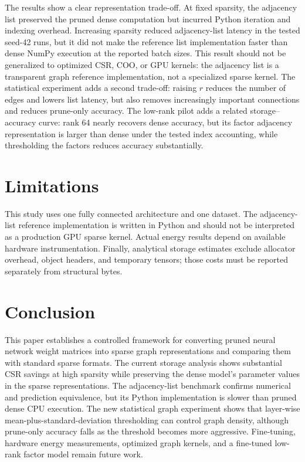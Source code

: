 \documentclass[11pt]{article}
\begin{document}
The results show a clear representation trade-off.  At fixed sparsity, the
adjacency list preserved the pruned dense computation but incurred Python
iteration and indexing overhead.  Increasing sparsity reduced adjacency-list
latency in the tested seed-42 runs, but it did not make the reference list
implementation faster than dense NumPy execution at the reported batch sizes.
This result should not be generalized to optimized CSR, COO, or GPU kernels:
the adjacency list is a transparent graph reference implementation, not a
specialized sparse kernel.  The statistical experiment adds a second trade-off:
raising $r$ reduces the number of edges and lowers list latency, but also
removes increasingly important connections and reduces prune-only accuracy.
The low-rank pilot adds a related storage--accuracy curve: rank 64 nearly
recovers dense accuracy, but its factor adjacency representation is larger
than dense under the tested index accounting, while thresholding the factors
reduces accuracy substantially.

\section{Limitations}

This study uses one fully connected architecture and one dataset.  The
adjacency-list reference implementation is written in Python and should not be
interpreted as a production GPU sparse kernel.  Actual energy results depend on
available hardware instrumentation.  Finally, analytical storage estimates
exclude allocator overhead, object headers, and temporary tensors; those costs
must be reported separately from structural bytes.

\section{Conclusion}

This paper establishes a controlled framework for converting pruned neural
network weight matrices into sparse graph representations and comparing them
with standard sparse formats.  The current storage analysis shows substantial
CSR savings at high sparsity while preserving the dense model's parameter
values in the sparse representations.  The adjacency-list benchmark confirms
numerical and prediction equivalence, but its Python implementation is slower
than pruned dense CPU execution.  The new statistical graph experiment shows
that layer-wise mean-plus-standard-deviation thresholding can control graph
density, although prune-only accuracy falls as the threshold becomes more
aggressive.  Fine-tuning, hardware energy measurements, optimized graph
kernels, and a fine-tuned low-rank factor model remain future work.



\end{document}

